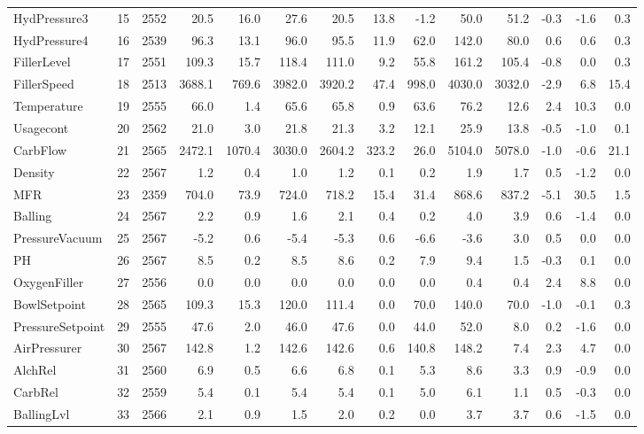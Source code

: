 \documentclass[]{report}
\begin{document}
\begin{table}[H]
\begin{tabular}{lrrrrrrrrrrrrr}
\rowcolor{gray!6}  HydPressure3 & 15 & 2552 & 20.5 & 16.0 & 27.6 & 20.5 & 13.8 & -1.2 & 50.0 & 51.2 & -0.3 & -1.6 & 0.3\\
\addlinespace
HydPressure4 & 16 & 2539 & 96.3 & 13.1 & 96.0 & 95.5 & 11.9 & 62.0 & 142.0 & 80.0 & 0.6 & 0.6 & 0.3\\
\rowcolor{gray!6}  FillerLevel & 17 & 2551 & 109.3 & 15.7 & 118.4 & 111.0 & 9.2 & 55.8 & 161.2 & 105.4 & -0.8 & 0.0 & 0.3\\
FillerSpeed & 18 & 2513 & 3688.1 & 769.6 & 3982.0 & 3920.2 & 47.4 & 998.0 & 4030.0 & 3032.0 & -2.9 & 6.8 & 15.4\\
\rowcolor{gray!6}  Temperature & 19 & 2555 & 66.0 & 1.4 & 65.6 & 65.8 & 0.9 & 63.6 & 76.2 & 12.6 & 2.4 & 10.3 & 0.0\\
Usagecont & 20 & 2562 & 21.0 & 3.0 & 21.8 & 21.3 & 3.2 & 12.1 & 25.9 & 13.8 & -0.5 & -1.0 & 0.1\\
\addlinespace
\rowcolor{gray!6}  CarbFlow & 21 & 2565 & 2472.1 & 1070.4 & 3030.0 & 2604.2 & 323.2 & 26.0 & 5104.0 & 5078.0 & -1.0 & -0.6 & 21.1\\
Density & 22 & 2567 & 1.2 & 0.4 & 1.0 & 1.2 & 0.1 & 0.2 & 1.9 & 1.7 & 0.5 & -1.2 & 0.0\\
\rowcolor{gray!6}  MFR & 23 & 2359 & 704.0 & 73.9 & 724.0 & 718.2 & 15.4 & 31.4 & 868.6 & 837.2 & -5.1 & 30.5 & 1.5\\
Balling & 24 & 2567 & 2.2 & 0.9 & 1.6 & 2.1 & 0.4 & 0.2 & 4.0 & 3.9 & 0.6 & -1.4 & 0.0\\
\rowcolor{gray!6}  PressureVacuum & 25 & 2567 & -5.2 & 0.6 & -5.4 & -5.3 & 0.6 & -6.6 & -3.6 & 3.0 & 0.5 & 0.0 & 0.0\\
\addlinespace
PH & 26 & 2567 & 8.5 & 0.2 & 8.5 & 8.6 & 0.2 & 7.9 & 9.4 & 1.5 & -0.3 & 0.1 & 0.0\\
\rowcolor{gray!6}  OxygenFiller & 27 & 2556 & 0.0 & 0.0 & 0.0 & 0.0 & 0.0 & 0.0 & 0.4 & 0.4 & 2.4 & 8.8 & 0.0\\
BowlSetpoint & 28 & 2565 & 109.3 & 15.3 & 120.0 & 111.4 & 0.0 & 70.0 & 140.0 & 70.0 & -1.0 & -0.1 & 0.3\\
\rowcolor{gray!6}  PressureSetpoint & 29 & 2555 & 47.6 & 2.0 & 46.0 & 47.6 & 0.0 & 44.0 & 52.0 & 8.0 & 0.2 & -1.6 & 0.0\\
AirPressurer & 30 & 2567 & 142.8 & 1.2 & 142.6 & 142.6 & 0.6 & 140.8 & 148.2 & 7.4 & 2.3 & 4.7 & 0.0\\
\addlinespace
\rowcolor{gray!6}  AlchRel & 31 & 2560 & 6.9 & 0.5 & 6.6 & 6.8 & 0.1 & 5.3 & 8.6 & 3.3 & 0.9 & -0.9 & 0.0\\
CarbRel & 32 & 2559 & 5.4 & 0.1 & 5.4 & 5.4 & 0.1 & 5.0 & 6.1 & 1.1 & 0.5 & -0.3 & 0.0\\
\rowcolor{gray!6}  BallingLvl & 33 & 2566 & 2.1 & 0.9 & 1.5 & 2.0 & 0.2 & 0.0 & 3.7 & 3.7 & 0.6 & -1.5 & 0.0\\
\bottomrule
\end{tabular}
\endgroup{}
\end{table}
\end{document}
